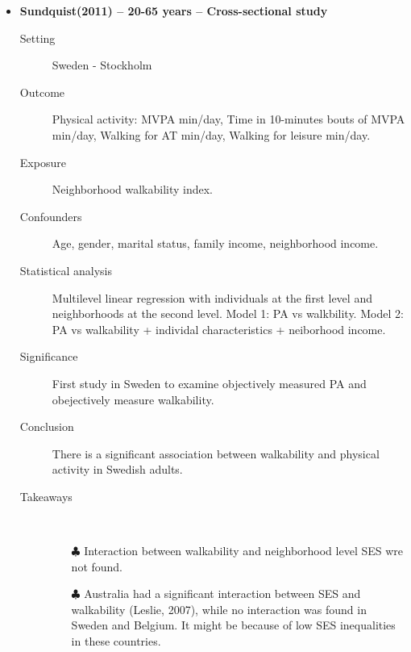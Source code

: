\documentclass{article}
\begin{document}
\begin{itemize}
\newpage
\item{\bf Sundquist(2011) -- 20-65 years  -- Cross-sectional study}
		\begin{description}
			\item[Setting] Sweden - Stockholm 
			\item[Outcome] Physical activity: MVPA min/day, Time in 10-minutes bouts of MVPA min/day, Walking for AT min/day, Walking for leisure min/day. 
			\item[Exposure] Neighborhood walkability index.  
			\item[Confounders] Age, gender, marital status, family income, neighborhood income. 
			\item[Statistical analysis] Multilevel linear regression with individuals at the first level and neighborhoods at the second level. Model 1: PA vs walkbility. Model 2: PA vs walkability + individal characteristics + neiborhood income. 
			\item[Significance] First study in Sweden to examine objectively measured PA and obejectively measure walkability.  
			\item[Conclusion] There is a significant association between walkability and physical activity in Swedish adults. 
			\item[Takeaways] \mbox{}\\
				\begin{itemize}
					\item[$\clubsuit$] Interaction between walkability and neighborhood level SES wre not found.
					\item[$\clubsuit$] Australia had a significant interaction between SES and walkability (Leslie, 2007), while no interaction was found in Sweden and Belgium. It might be because of low SES inequalities in these countries.  
				\end{itemize} 
			
		\end{description}


\end{itemize}
\end{document}
